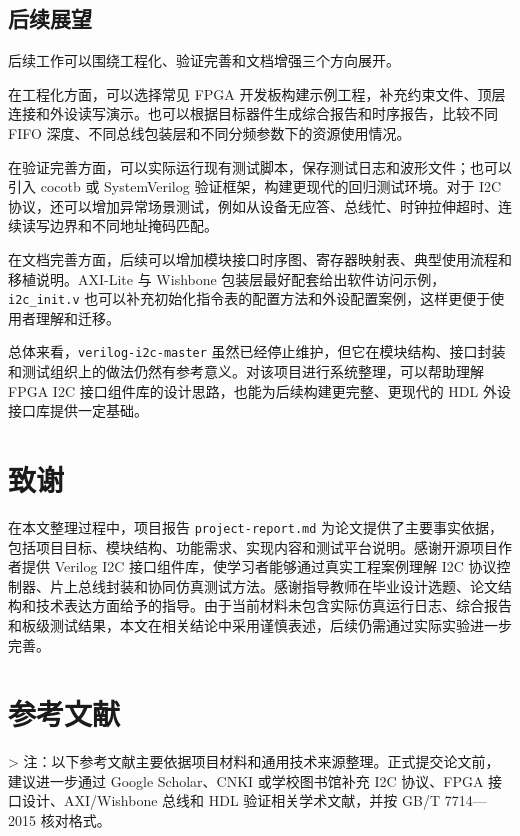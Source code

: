 \documentclass[12pt,a4paper]{article}
\numberwithin{equation}{section}
\begin{document}
\subsection{后续展望}

后续工作可以围绕工程化、验证完善和文档增强三个方向展开。

在工程化方面，可以选择常见 FPGA 开发板构建示例工程，补充约束文件、顶层连接和外设读写演示。也可以根据目标器件生成综合报告和时序报告，比较不同 FIFO 深度、不同总线包装层和不同分频参数下的资源使用情况。

在验证完善方面，可以实际运行现有测试脚本，保存测试日志和波形文件；也可以引入 cocotb 或 SystemVerilog 验证框架，构建更现代的回归测试环境。对于 I2C 协议，还可以增加异常场景测试，例如从设备无应答、总线忙、时钟拉伸超时、连续读写边界和不同地址掩码匹配。

在文档完善方面，后续可以增加模块接口时序图、寄存器映射表、典型使用流程和移植说明。AXI-Lite 与 Wishbone 包装层最好配套给出软件访问示例，\texttt{i2c\_init.v} 也可以补充初始化指令表的配置方法和外设配置案例，这样更便于使用者理解和迁移。

总体来看，\texttt{verilog-i2c-master} 虽然已经停止维护，但它在模块结构、接口封装和测试组织上的做法仍然有参考意义。对该项目进行系统整理，可以帮助理解 FPGA I2C 接口组件库的设计思路，也能为后续构建更完整、更现代的 HDL 外设接口库提供一定基础。

\clearpage
\section{致谢}

在本文整理过程中，项目报告 \texttt{project-report.md} 为论文提供了主要事实依据，包括项目目标、模块结构、功能需求、实现内容和测试平台说明。感谢开源项目作者提供 Verilog I2C 接口组件库，使学习者能够通过真实工程案例理解 I2C 协议控制器、片上总线封装和协同仿真测试方法。感谢指导教师在毕业设计选题、论文结构和技术表达方面给予的指导。由于当前材料未包含实际仿真运行日志、综合报告和板级测试结果，本文在相关结论中采用谨慎表述，后续仍需通过实际实验进一步完善。

\clearpage
\section{参考文献}

> 注：以下参考文献主要依据项目材料和通用技术来源整理。正式提交论文前，建议进一步通过 Google Scholar、CNKI 或学校图书馆补充 I2C 协议、FPGA 接口设计、AXI/Wishbone 总线和 HDL 验证相关学术文献，并按 GB/T 7714—2015 核对格式。
\end{document}
